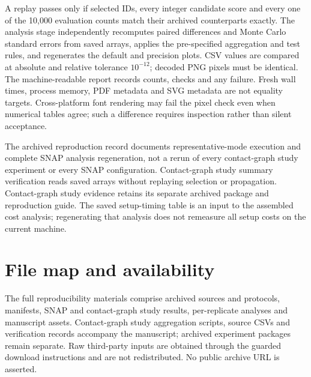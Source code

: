 \documentclass[smallextended]{svjour3}
\begin{document}
A replay passes only if selected IDs, every integer candidate score and every
one of the 10,000 evaluation counts match their archived counterparts exactly.
The analysis stage independently recomputes paired differences and Monte Carlo
standard errors from saved arrays, applies the pre-specified aggregation and test rules,
and regenerates the default and precision plots. CSV values are compared at
absolute and relative tolerance $10^{-12}$; decoded PNG pixels must be identical.
The machine-readable report records counts, checks and any failure. Fresh wall
times, process memory, PDF metadata and SVG metadata are not equality targets.
Cross-platform font rendering may fail the pixel check even when numerical
tables agree; such a difference requires inspection rather than silent acceptance.

The archived reproduction record documents representative-mode execution and
complete SNAP analysis regeneration, not a rerun of every contact-graph study
experiment or every SNAP configuration. Contact-graph study summary verification reads
saved arrays without replaying selection or propagation.
Contact-graph study evidence retains its separate archived package and reproduction guide.
The saved setup-timing table is an input to the assembled cost analysis; regenerating
that analysis does not remeasure all setup costs on the current machine.

\clearpage

\clearpage

\section{File map and availability}
The full reproducibility materials comprise archived sources and protocols,
manifests, SNAP and contact-graph study results, per-replicate analyses and manuscript
assets. Contact-graph study aggregation scripts, source CSVs and verification records
accompany the manuscript; archived experiment packages remain separate. Raw
third-party inputs are obtained through the guarded download instructions and
are not redistributed. No public archive URL is asserted.
\end{document}
